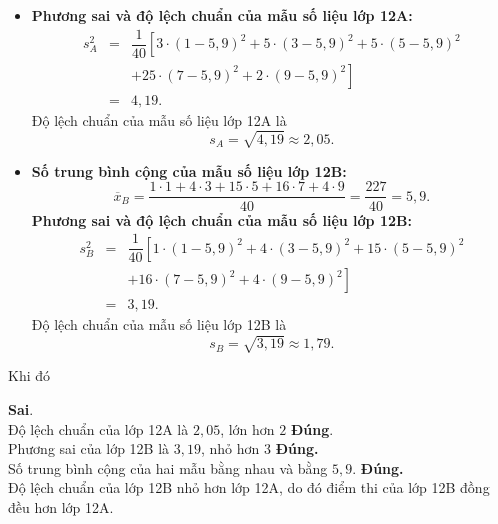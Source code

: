 \begin{ex}
{\begin{itemize}
			\[
			\overline{x}_A = \dfrac{3 \cdot 1 + 5 \cdot 3 + 5 \cdot 5 + 25 \cdot 7 + 2 \cdot 9}{40} = \dfrac{227}{40} = 5,9.
			\]
			\item \textbf{Phương sai và độ lệch chuẩn của mẫu số liệu lớp 12A:}
			\begin{eqnarray*}
				s_A^2 &=& \dfrac{1}{40} \left[3 \cdot (1 - 5,9)^2 + 5 \cdot (3 - 5,9)^2 + 5 \cdot (5 - 5,9)^2\right. \\
				&&\left.+ 25 \cdot (7 - 5,9)^2 + 2 \cdot (9 - 5,9)^2\right]\\
				&=&  4{,}19.
			\end{eqnarray*}
			Độ lệch chuẩn của mẫu số liệu lớp 12A là
			\[
			s_A = \sqrt{4{,}19} \approx 2{,}05.
			\]
			\item \textbf{Số trung bình cộng của mẫu số liệu lớp 12B:}
			\[
			\overline{x}_B = \dfrac{1 \cdot 1 + 4 \cdot 3 + 15 \cdot 5 + 16 \cdot 7 + 4 \cdot 9}{40} = \dfrac{227}{40} = 5{,}9.
			\]			
			\textbf{Phương sai và độ lệch chuẩn của mẫu số liệu lớp 12B:}
			\begin{eqnarray*}
				s_B^2 &=& \dfrac{1}{40} \left[1 \cdot (1 - 5,9)^2 + 4 \cdot (3 - 5,9)^2 + 15 \cdot (5 - 5,9)^2\right.\\
				&&\left.+ 16 \cdot (7 - 5,9)^2 + 4 \cdot (9 - 5,9)^2\right] \\
				&=&3{,}19.
			\end{eqnarray*}
			Độ lệch chuẩn của mẫu số liệu lớp 12B là
			\[
			s_B = \sqrt{3{,}19} \approx 1{,}79.
			\]
		\end{itemize}
		Khi đó 
		\begin{itemchoice} 
			\itemch \textbf{Sai}.\\
			Độ lệch chuẩn của lớp 12A là $2{,}05$, lớn hơn $2$ 
			\itemch \textbf{Đúng}.\\
			Phương sai của lớp 12B là $3{,}19$, nhỏ hơn $3$
			\itemch \textbf{Đúng.} \\
			Số trung bình cộng của hai mẫu bằng nhau và bằng $5,9$.
			\itemch \textbf{Đúng.} \\
			Độ lệch chuẩn của lớp 12B nhỏ hơn lớp 12A, do đó điểm thi của lớp 12B đồng đều hơn lớp 12A.
		\end{itemchoice}
	}
\end{ex}

